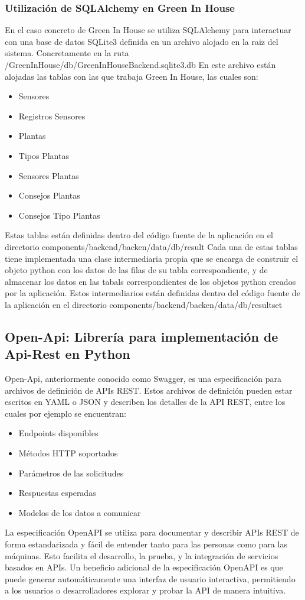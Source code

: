         \subsubsection{Utilización de SQLAlchemy en Green In House}
        En el caso concreto de Green In House se utiliza SQLAlchemy para interactuar con una base de datos SQLite3 definida en un archivo alojado en la raiz del sistema. Concretamente en la ruta /GreenInHouse/db/GreenInHouseBackend.sqlite3.db
        En este archivo están alojadas las tablas con las que trabaja Green In House, las cuales son:
        \begin{itemize}
            \item Sensores
            \item Registros Sensores
            \item Plantas
            \item Tipos Plantas
            \item Sensores Plantas
            \item Consejos Plantas
            \item Consejos Tipo Plantas
        \end{itemize}
        Estas tablas están definidas dentro del código fuente de la aplicación en el directorio components/backend/backen/data/db/result
        Cada una de estas tablas tiene implementada una clase intermediaria propia que se encarga de construir el objeto python con los datos de las filas de su tabla correspondiente, y de almacenar los datos en las tabals correspondientes de los objetos python creados por la aplicación. Estos intermediarios están definidas dentro del código fuente de la aplicación en el directorio components/backend/backen/data/db/resultset

    \subsection{Open-Api: Librería para implementación de Api-Rest en Python}
    Open-Api, anteriormente conocido como Swagger, es una especificación para archivos de definición de APIs REST. Estos archivos de definición pueden estar escritos en YAML o JSON y describen los detalles de la API REST, entre los cuales por ejemplo se encuentran:
    \begin{itemize}
        \item Endpoints disponibles
        \item Métodos HTTP soportados
        \item Parámetros de las solicitudes
        \item Respuestas esperadas 
        \item Modelos de los datos a comunicar 
    \end{itemize}
    La especificación OpenAPI se utiliza para documentar y describir APIs REST de forma estandarizada y fácil de entender tanto para las personas como para las máquinas. Esto facilita el desarrollo, la prueba, y la integración de servicios basados en APIs. Un beneficio adicional de la especificación OpenAPI es que puede generar automáticamente una interfaz de usuario interactiva, permitiendo a los usuarios o desarrolladores explorar y probar la API de manera intuitiva.

